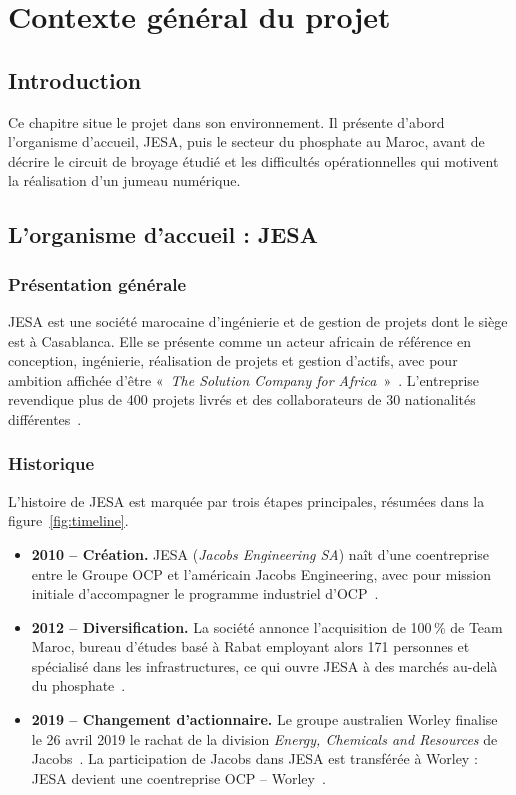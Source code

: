 \chapter{Contexte général du projet}
\label{chap:contexte}

\section{Introduction}
Ce chapitre situe le projet dans son environnement. Il présente d'abord l'organisme d'accueil, JESA, puis le secteur du phosphate au Maroc, avant de décrire le circuit de broyage étudié et les difficultés opérationnelles qui motivent la réalisation d'un jumeau numérique.

\section{L'organisme d'accueil : JESA}

\subsection{Présentation générale}
JESA est une société marocaine d'ingénierie et de gestion de projets dont le siège est à Casablanca. Elle se présente comme un acteur africain de référence en conception, ingénierie, réalisation de projets et gestion d'actifs, avec pour ambition affichée d'être «~\textit{The Solution Company for Africa}~»~\cite{jesaabout}. L'entreprise revendique plus de 400 projets livrés et des collaborateurs de 30 nationalités différentes~\cite{jesaabout}.

\subsection{Historique}
L'histoire de JESA est marquée par trois étapes principales, résumées dans la figure~\ref{fig:timeline}.

\begin{itemize}
  \item \textbf{2010 -- Création.} JESA (\textit{Jacobs Engineering SA}) naît d'une coentreprise entre le Groupe OCP et l'américain Jacobs Engineering, avec pour mission initiale d'accompagner le programme industriel d'OCP~\cite{jesawiki,jesaabout}.
  \item \textbf{2012 -- Diversification.} La société annonce l'acquisition de 100\,\% de Team Maroc, bureau d'études basé à Rabat employant alors 171 personnes et spécialisé dans les infrastructures, ce qui ouvre JESA à des marchés au-delà du phosphate~\cite{jacobsteammaroc}.
  \item \textbf{2019 -- Changement d'actionnaire.} Le groupe australien Worley finalise le 26 avril 2019 le rachat de la division \textit{Energy, Chemicals and Resources} de Jacobs~\cite{worleyasx}. La participation de Jacobs dans JESA est transférée à Worley : JESA devient une coentreprise OCP -- Worley~\cite{jesawiki}.
\end{itemize}

